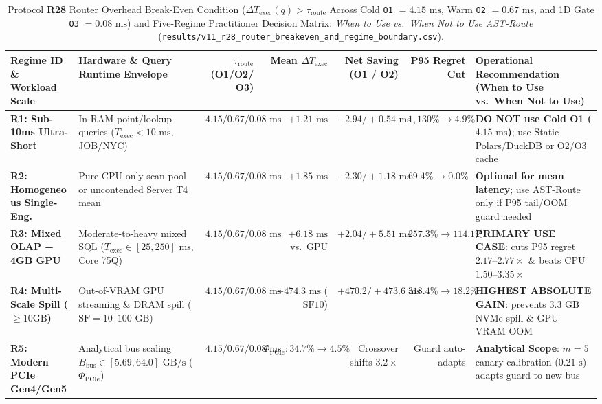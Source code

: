 \documentclass[10pt,a4paper]{article}
\begin{document}
\begin{table}[htbp]
\centering
\scriptsize
\setlength{\tabcolsep}{2.3pt}
\caption{Protocol \textbf{R28} Router Overhead Break-Even Condition ($\Delta T_{\text{exec}}(q) > \tau_{\text{route}}$ Across Cold \texttt{O1} $=4.15\text{ ms}$, Warm \texttt{O2} $=0.67\text{ ms}$, and 1D Gate \texttt{O3} $=0.08\text{ ms}$) and Five-Regime Practitioner Decision Matrix: \emph{When to Use vs.\ When Not to Use AST-Route} (\texttt{results/v11\_r28\_router\_breakeven\_and\_regime\_boundary.csv}).}\label{tab:supp_v11_r28_breakeven_regimes}
\begin{tabular}{@{}llrrrrl@{}}
\toprule
\textbf{Regime ID \& Workload Scale} & \textbf{Hardware \& Query Runtime Envelope} & \textbf{$\tau_{\text{route}}$ (O1/O2/O3)} & \textbf{Mean $\Delta T_{\text{exec}}$} & \textbf{Net Saving (O1 / O2)} & \textbf{P95 Regret Cut} & \textbf{Operational Recommendation (When to Use vs.\ When Not to Use)} \\
\midrule
\textbf{R1: Sub-10ms Ultra-Short} & In-RAM point/lookup queries ($T_{\text{exec}}<10\text{ ms}$, JOB/NYC) & $4.15 / 0.67 / 0.08\text{ ms}$ & $+1.21\text{ ms}$ & $-2.94 / +0.54\text{ ms}$ & $1{,}130\%\rightarrow 4.9\%$ & \textbf{DO NOT use Cold O1 ($4.15\text{ ms}$)}; use Static Polars/DuckDB or O2/O3 cache \\
\textbf{R2: Homogeneous Single-Eng.} & Pure CPU-only scan pool or uncontended Server T4 mean & $4.15 / 0.67 / 0.08\text{ ms}$ & $+1.85\text{ ms}$ & $-2.30 / +1.18\text{ ms}$ & $69.4\%\rightarrow 0.0\%$ & \textbf{Optional for mean latency}; use AST-Route only if P95 tail/OOM guard needed \\
\textbf{R3: Mixed OLAP + 4GB GPU} & Moderate-to-heavy mixed SQL ($T_{\text{exec}}\in[25,250]\text{ ms}$, Core 75Q) & $4.15 / 0.67 / 0.08\text{ ms}$ & $+6.18\text{ ms}$ vs.\ GPU & $+2.04 / +5.51\text{ ms}$ & $\mathbf{257.3\%\rightarrow 114.1\%}$ & \textbf{PRIMARY USE CASE}: cuts P95 regret $2.17\text{--}2.77\times$ \& beats CPU $1.50\text{--}3.35\times$ \\
\textbf{R4: Multi-Scale Spill ($\ge 10\text{GB}$)} & Out-of-VRAM GPU streaming \& DRAM spill ($\text{SF}=10\text{--}100\text{ GB}$) & $4.15 / 0.67 / 0.08\text{ ms}$ & $+474.3\text{ ms}$ ($\text{SF}10$) & $+470.2 / +473.6\text{ ms}$ & $\mathbf{318.4\%\rightarrow 18.2\%}$ & \textbf{HIGHEST ABSOLUTE GAIN}: prevents $3.3\text{ GB}$ NVMe spill \& GPU VRAM OOM \\
\textbf{R5: Modern PCIe Gen4/Gen5} & Analytical bus scaling $B_{\text{bus}}\in[5.69, 64.0]\text{ GB/s}$ ($\Phi_{\text{PCIe}}$) & $4.15 / 0.67 / 0.08\text{ ms}$ & $\Phi_{\text{PCIe}}: 34.7\%\rightarrow 4.5\%$ & Crossover shifts $3.2\times$ & Guard auto-adapts & \textbf{Analytical Scope}: $m=5$ canary calibration ($0.21\text{ s}$) adapts guard to new bus \\
\bottomrule
\end{tabular}
\end{table}
\end{document}
